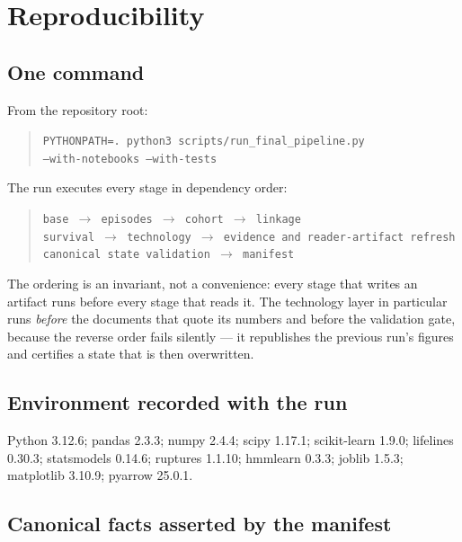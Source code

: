\section{Reproducibility}
\label{app:repro}

\subsection*{One command}

From the repository root:

\begin{quote}
\texttt{PYTHONPATH=. python3 scripts/run\_final\_pipeline.py}\\ \texttt{\phantom{xx}--with-notebooks --with-tests}
\end{quote}

The run executes every stage in dependency order:

\begin{quote}
\texttt{base $\rightarrow$ episodes $\rightarrow$ cohort $\rightarrow$ linkage}\\
\texttt{survival $\rightarrow$ technology $\rightarrow$ evidence and reader-artifact refresh}\\
\texttt{canonical state validation $\rightarrow$ manifest}
\end{quote}

The ordering is an invariant, not a convenience: every stage that writes an artifact runs before every stage
that reads it. The technology layer in particular runs \emph{before} the documents that quote its numbers and
before the validation gate, because the reverse order fails silently --- it republishes the previous run's
figures and certifies a state that is then overwritten.

\subsection*{Environment recorded with the run}

Python 3.12.6; pandas 2.3.3; numpy 2.4.4; scipy 1.17.1; scikit-learn 1.9.0; lifelines 0.30.3; statsmodels
0.14.6; ruptures 1.1.10; hmmlearn 0.3.3; joblib 1.5.3; matplotlib 3.10.9; pyarrow 25.0.1.

\subsection*{Canonical facts asserted by the manifest}

